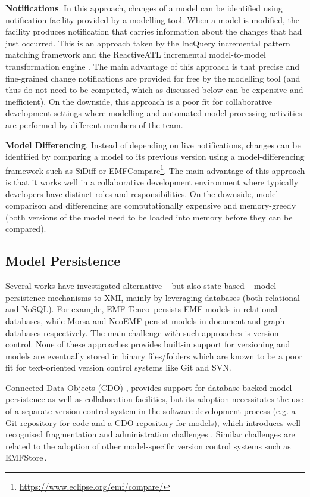 \documentclass[12pt, a4paper]{report} \usepackage[titletoc]{appendix}
\begin{document}
\textbf{Notifications}. In this approach, changes of a model can be identified using  notification facility provided by a modelling tool. When a model is modified, the facility produces notification that carries information about the changes that had just occurred. This is an approach taken by the IncQuery incremental pattern matching framework \cite{rath2012derived} and the ReactiveATL incremental model-to-model transformation engine \cite{ogunyomi2015property}. The main advantage of this approach is that precise and fine-grained change notifications are provided for free by the modelling tool (and thus do not need to be computed, which as discussed below can be expensive and inefficient). On the downside, this approach is a poor fit for collaborative development settings where modelling and automated model processing activities are performed by different members of the team.

\textbf{Model Differencing}. Instead of depending on live notifications, changes can be identified by comparing a model to its previous version using a model-differencing framework such as SiDiff \cite{kelter2005generic} or EMFCompare\footnote{\url{https://www.eclipse.org/emf/compare/}}. The main advantage of this approach is that it works well in a collaborative development environment where typically developers have distinct roles and responsibilities. On the downside, model comparison and differencing are computationally expensive and memory-greedy (both versions of the model need to be loaded into memory before they can be compared).

\subsection{Model Persistence}
\label{subsec:model_persistence}
Several works have investigated alternative -- but also state-based -- model persistence mechanisms to XMI, mainly by leveraging databases (both relational and NoSQL). For example, EMF Teneo\,\cite{eclipse2017teneo} persists EMF models in relational databases, while Morsa \cite{pagan2011morsa} and NeoEMF \cite{daniel2016neoemf} persist models in document and graph databases respectively. The main challenge with such approaches is version control. None of these approaches provides built-in support for versioning and models are eventually stored in binary files/folders which are known to be a poor fit for text-oriented version control systems like Git and SVN.

Connected Data Objects (CDO) \cite{eclipse2017cdo}, provides support for database-backed model persistence as well as collaboration facilities, but its adoption necessitates the use of a separate version control system in the software development process (e.g. a Git repository for code and a CDO repository for models), which introduces well-recognised fragmentation and administration challenges \cite{barmpis2014evaluation}. Similar challenges are related to the adoption of other model-specific version control systems such as EMFStore\,\cite{koegel2010emfstore}.
\end{document}
